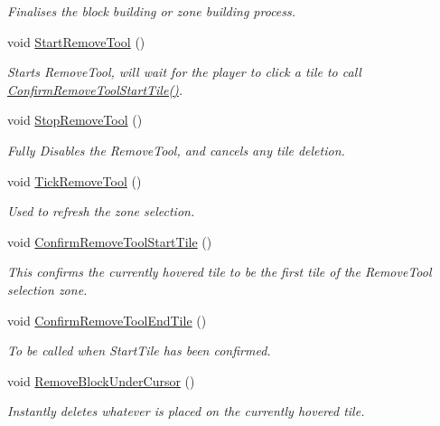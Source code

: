 \begin{DoxyCompactItemize}
\begin{DoxyCompactList}\small\item\em Finalises the block building or zone building process. \end{DoxyCompactList}\item 
void \mbox{\hyperlink{class_a_t_t___player_grid_camera_aa5e54106a559060b452e8f39ac2b83c4}{Start\+Remove\+Tool}} ()
\begin{DoxyCompactList}\small\item\em Starts Remove\+Tool, will wait for the player to click a tile to call \mbox{\hyperlink{class_a_t_t___player_grid_camera_aec01f397402202fb08dea3a659256baa}{Confirm\+Remove\+Tool\+Start\+Tile()}}. \end{DoxyCompactList}\item 
void \mbox{\hyperlink{class_a_t_t___player_grid_camera_aa29ae802ebeb61c95d7bfdba3021eb62}{Stop\+Remove\+Tool}} ()
\begin{DoxyCompactList}\small\item\em Fully Disables the Remove\+Tool, and cancels any tile deletion. \end{DoxyCompactList}\item 
void \mbox{\hyperlink{class_a_t_t___player_grid_camera_a1d0784f96f603f5dae27ff61e329c527}{Tick\+Remove\+Tool}} ()
\begin{DoxyCompactList}\small\item\em Used to refresh the zone selection. \end{DoxyCompactList}\item 
void \mbox{\hyperlink{class_a_t_t___player_grid_camera_aec01f397402202fb08dea3a659256baa}{Confirm\+Remove\+Tool\+Start\+Tile}} ()
\begin{DoxyCompactList}\small\item\em This confirms the currently hovered tile to be the first tile of the Remove\+Tool selection zone. \end{DoxyCompactList}\item 
void \mbox{\hyperlink{class_a_t_t___player_grid_camera_a26a23b23a58d5bbeab3359dcbd359b3a}{Confirm\+Remove\+Tool\+End\+Tile}} ()
\begin{DoxyCompactList}\small\item\em To be called when Start\+Tile has been confirmed. \end{DoxyCompactList}\item 
void \mbox{\hyperlink{class_a_t_t___player_grid_camera_a330aef5a0f8e06fa1d70aa07cdf72c3a}{Remove\+Block\+Under\+Cursor}} ()
\begin{DoxyCompactList}\small\item\em Instantly deletes whatever is placed on the currently hovered tile. \end{DoxyCompactList}\item 

\end{DoxyCompactItemize}
